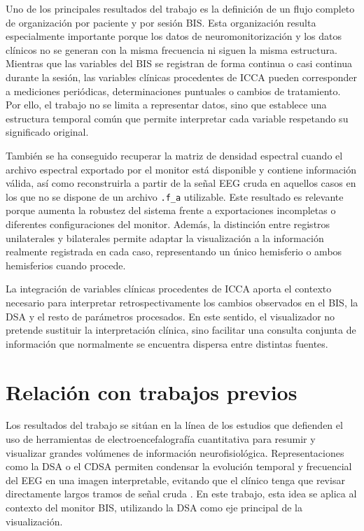 \documentclass[
  spanish,
  a4paper,
  12pt,
  twoside]{memoir}
\begin{document}
Uno de los principales resultados del trabajo es la definición de un
flujo completo de organización por paciente y por sesión BIS. Esta
organización resulta especialmente importante porque los datos de
neuromonitorización y los datos clínicos no se generan con la misma
frecuencia ni siguen la misma estructura. Mientras que las variables del
BIS se registran de forma continua o casi continua durante la sesión,
las variables clínicas procedentes de ICCA pueden corresponder a
mediciones periódicas, determinaciones puntuales o cambios de
tratamiento. Por ello, el trabajo no se limita a representar datos, sino
que establece una estructura temporal común que permite interpretar cada
variable respetando su significado original.

También se ha conseguido recuperar la matriz de densidad espectral
cuando el archivo espectral exportado por el monitor está disponible y
contiene información válida, así como reconstruirla a partir de la señal
EEG cruda en aquellos casos en los que no se dispone de un archivo
\texttt{.f\_a} utilizable. Este resultado es relevante porque aumenta la
robustez del sistema frente a exportaciones incompletas o diferentes
configuraciones del monitor. Además, la distinción entre registros
unilaterales y bilaterales permite adaptar la visualización a la
información realmente registrada en cada caso, representando un único
hemisferio o ambos hemisferios cuando procede.

La integración de variables clínicas procedentes de ICCA aporta el
contexto necesario para interpretar retrospectivamente los cambios
observados en el BIS, la DSA y el resto de parámetros procesados. En
este sentido, el visualizador no pretende sustituir la interpretación
clínica, sino facilitar una consulta conjunta de información que
normalmente se encuentra dispersa entre distintas fuentes.

\section{Relación con trabajos
previos}\label{relaciuxf3n-con-trabajos-previos}

Los resultados del trabajo se sitúan en la línea de los estudios que
defienden el uso de herramientas de electroencefalografía cuantitativa
para resumir y visualizar grandes volúmenes de información
neurofisiológica. Representaciones como la DSA o el CDSA permiten
condensar la evolución temporal y frecuencial del EEG en una imagen
interpretable, evitando que el clínico tenga que revisar directamente
largos tramos de señal cruda \citep{Hwang2022}. En este trabajo, esta
idea se aplica al contexto del monitor BIS, utilizando la DSA como eje
principal de la visualización.
\end{document}
